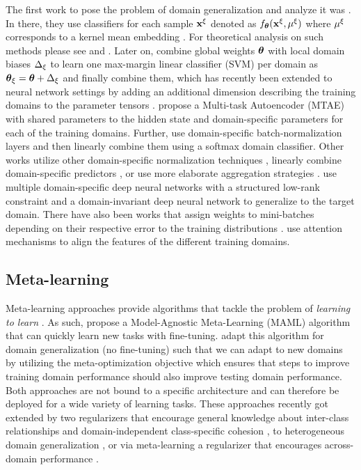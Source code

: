 The first work to pose the problem of domain generalization and analyze it was \citet{BlanchardLS11}. In there, they use classifiers for each sample $\mathbf{x}^\xi$  denoted as $f_{\boldsymbol{\theta}}(\mathbf{x}^\xi, \mu^\xi)$ where $\mu^\xi$ corresponds to a kernel mean embedding \citep{MuandetFSS17}. For theoretical analysis on such methods please see \citet{an2019generalization} and \citet{blanchard2017domain}. Later on, \citet{KhoslaZMET12} combine global weights $\boldsymbol{\theta}$ with local domain biases $\Delta_\xi$ to learn one max-margin linear classifier (SVM) per domain as $\boldsymbol{\theta}_\xi = \boldsymbol{\theta} + \Delta_\xi$ and finally combine them, which has recently been extended to neural network settings by adding an additional dimension describing the training domains to the parameter tensors \citep{LiYSH17}. \citet{GhifaryKZB15} propose a Multi-task Autoencoder (MTAE) with shared parameters to the hidden state and domain-specific parameters for each of the training domains. Further, \citet{ManciniBCR18} use domain-specific batch-normalization \citep{IoffeS15} layers and then linearly combine them using a softmax domain classifier. Other works utilize other domain-specific normalization techniques \citep{seo2019learning}, linearly combine domain-specific predictors \citep{ManciniBC018}, or use more elaborate aggregation strategies \citep{DInnocenteC18}. \citet{DingF18} use multiple domain-specific deep neural networks with a structured low-rank constraint and a domain-invariant deep neural network to generalize to the target domain. There have also been works that assign weights to mini-batches depending on their respective error to the training distributions \citep{HuNSS18, sagawa2019distributionally}. \citet{jin2020feature} use attention mechanisms to align the features of the different training domains.

\subsection{Meta-learning}
Meta-learning approaches provide algorithms that tackle the problem of  \emph{learning  to learn} \citep{1998TP, SchmidhuberZW97}.
 As such, \citet{FinnAL17} propose a Model-Agnostic Meta-Learning (MAML) algorithm that can quickly learn new tasks with fine-tuning. \citet{LiYSH18} adapt this algorithm for domain generalization (no fine-tuning) such that we can adapt to new domains by utilizing the meta-optimization objective which ensures that steps to improve training domain performance should also improve testing domain performance. Both approaches are not bound to a specific architecture and can therefore be deployed for a wide variety of learning tasks. These approaches recently got extended by two regularizers that encourage general knowledge about inter-class relationships and domain-independent class-specific cohesion \citep{DouCKG19}, to heterogeneous domain generalization \citep{LiYZH19}, or via meta-learning a regularizer that encourages across-domain performance \citep{BalajiSC18}.

